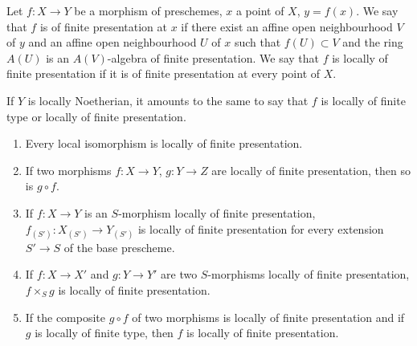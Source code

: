 \begin{definition}[1.4.2]
\label{IV.1.4.2}
Let $f:X\to Y$ be a morphism of preschemes, $x$ a point of $X$, $y=f(x)$.
We say that $f$ is of finite presentation at $x$ if there exist an
affine open neighbourhood $V$ of $y$ and an affine open neighbourhood $U$ of
$x$ such that $f(U)\subset V$ and the ring $A(U)$ is an $A(V)$-algebra of
finite presentation. We say that $f$ is locally of finite presentation
if it is of finite presentation at every point of $X$.
\end{definition}

If $Y$ is locally Noetherian, it amounts to the same to say that $f$ is
locally of finite type or locally of finite presentation.

\begin{proposition}[1.4.3]
\label{IV.1.4.3}
\begin{enumerate}
  \item[\textup{(i)}] Every local isomorphism is locally of finite presentation.
  \item[\textup{(ii)}] If two morphisms $f:X\to Y$, $g:Y\to Z$ are locally of
  finite presentation, then so is $g\circ f$.


  \item[\textup{(iii)}] If $f:X\to Y$ is an $S$-morphism locally of finite
  presentation, $f_{(S')}:X_{(S')}\to Y_{(S')}$ is locally of finite
  presentation for every extension $S'\to S$ of the base prescheme.
  \item[\textup{(iv)}] If $f:X\to X'$ and $g:Y\to Y'$ are two $S$-morphisms
  locally of finite presentation, $f\times_Sg$ is locally of finite
  presentation.
  \item[\textup{(v)}] If the composite $g\circ f$ of two morphisms is locally of
  finite presentation and if $g$ is locally of finite type, then $f$ is
  locally of finite presentation.
\end{enumerate}
\end{proposition}

